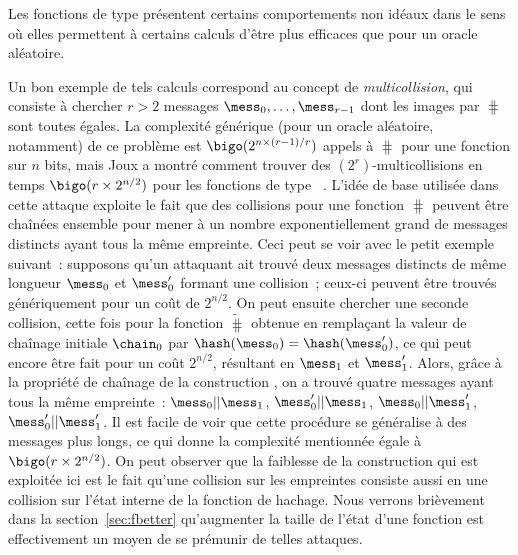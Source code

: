 Les fonctions de type \merkdam présentent certains comportements non idéaux dans le sens où elles permettent à certains calculs
d'être plus efficaces que pour un oracle aléatoire.

Un bon exemple de tels calculs correspond au concept de 
\emph{multicollision}, qui consiste à chercher $r > 2$ messages $\mess_{0},\ldots,\mess_{r-1}$ dont les images par $\hash$
sont toutes égales.
La complexité générique (pour un oracle aléatoire, notamment) de ce problème est
$\bigo(2^{n\times (r-1)/r})$ appels à $\hash$ pour une fonction sur $n$ bits, mais
Joux a montré comment trouver
des $(2^r)$-multicollisions en temps $\bigo(r\times 2^{n/2})$ pour les fonctions de type \merkdam~\cite{DBLP:conf/crypto/Joux04}.
L'idée de base utilisée dans cette attaque exploite le fait que des collisions pour une fonction \merkdam $\hash$ peuvent être chaînées
ensemble pour mener à un nombre exponentiellement grand de messages distincts ayant tous la même empreinte.
Ceci peut se voir avec le petit exemple suivant~: supposons qu'un attaquant ait trouvé deux messages distincts
de même longueur $\mess_0$ et $\mess'_0$ formant une collision~; ceux-ci peuvent être trouvés génériquement
pour un coût de
$2^{n/2}$. On peut ensuite chercher une seconde collision, cette fois pour la fonction $\widetilde \hash$ obtenue en remplaçant la valeur de chaînage initiale
$\chain_0$ par $\hash(\mess_0) = \hash(\mess'_0)$, ce qui peut encore être fait pour un coût $2^{n/2}$, résultant en $\mess_1$ et $\mess'_1$.
Alors, grâce à la propriété de chaînage de la construction \merkdam, on a trouvé quatre messages ayant tous la même empreinte~:
$\mess_0||\mess_1$, $\mess'_0||\mess_1$, $\mess_0||\mess'_1$, $\mess'_0||\mess'_1$. 
Il est facile de voir que cette procédure se généralise à des messages plus longs, ce qui donne la complexité mentionnée égale à
$\bigo(r \times 2^{n/2})$.
On peut observer que la faiblesse de la construction qui est exploitée ici est le fait qu'une collision
sur les empreintes consiste aussi en une collision sur l'état interne de la fonction de hachage.
Nous verrons brièvement dans la section~\ref{sec:fbetter} qu'augmenter la taille de l'état d'une fonction
est effectivement un moyen de se prémunir de telles attaques.

